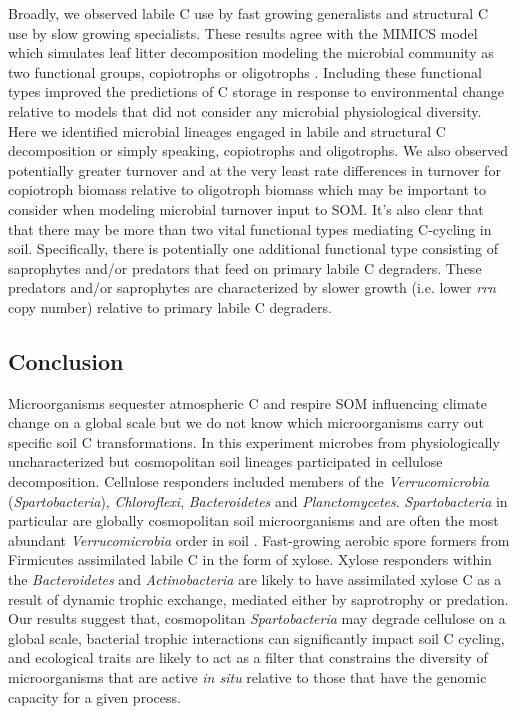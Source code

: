 Broadly, we observed labile C use by fast growing generalists and structural
C use by slow growing specialists. These results agree with the MIMICS model
which simulates leaf litter decomposition modeling the microbial community as
two functional groups, copiotrophs or oligotrophs \citep{wieder_2014a}.
Including these functional types improved the predictions of C storage in
response to environmental change relative to models that did not consider any
microbial physiological diversity. Here we identified microbial lineages
engaged in labile and structural C decomposition or simply speaking,
copiotrophs and oligotrophs. We also observed potentially greater turnover and
at the very least rate differences in turnover for copiotroph biomass relative
to oligotroph biomass which may be important to consider when modeling
microbial turnover input to SOM. It's also clear that that there may be more
than two vital functional types mediating C-cycling in soil. Specifically,
there is potentially one additional functional type consisting of saprophytes
and/or predators that feed on primary labile C degraders. These predators
and/or saprophytes are characterized by slower growth (i.e. lower \textit{rrn}
copy number) relative to primary labile C degraders. 

\subsection{Conclusion} 
Microorganisms sequester atmospheric C and respire SOM influencing climate
change on a global scale but we do not know which microorganisms carry out
specific soil C transformations. In this experiment microbes from
physiologically uncharacterized but cosmopolitan soil lineages participated in
cellulose decomposition. Cellulose responders included members of the
\textit{Verrucomicrobia} (\textit{Spartobacteria}), \textit{Chloroflexi},
\textit{Bacteroidetes} and \textit{Planctomycetes}. \textit{Spartobacteria} in
particular are globally cosmopolitan soil microorganisms and are often the most
abundant \textit{Verrucomicrobia} order in soil \citep{Bergmann_2011}.
Fast-growing aerobic spore formers from Firmicutes assimilated labile C in the
form of xylose. Xylose responders within the \textit{Bacteroidetes} and
\textit{Actinobacteria} are likely to have assimilated xylose C as a result of
dynamic trophic exchange, mediated either by saprotrophy or predation. Our
results suggest that, cosmopolitan \textit{Spartobacteria} may degrade
cellulose on a global scale, bacterial trophic interactions can significantly
impact soil C cycling, and ecological traits are likely to act as a filter that
constrains the diversity of microorganisms that are active \textit{in situ}
relative to those that have the genomic capacity for a given process.
